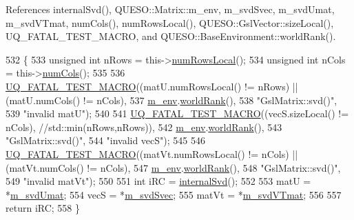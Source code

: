 References internal\-Svd(), Q\-U\-E\-S\-O\-::\-Matrix\-::m\-\_\-env, m\-\_\-svd\-Svec, m\-\_\-svd\-Umat, m\-\_\-svd\-V\-Tmat, num\-Cols(), num\-Rows\-Local(), Q\-U\-E\-S\-O\-::\-Gsl\-Vector\-::size\-Local(), U\-Q\-\_\-\-F\-A\-T\-A\-L\-\_\-\-T\-E\-S\-T\-\_\-\-M\-A\-C\-R\-O, and Q\-U\-E\-S\-O\-::\-Base\-Environment\-::world\-Rank().


\begin{DoxyCode}
532 \{
533   \textcolor{keywordtype}{unsigned} \textcolor{keywordtype}{int} nRows = this->\hyperlink{class_q_u_e_s_o_1_1_gsl_matrix_ab5ec937a9fd439eef1a87e12c0dbccb4}{numRowsLocal}();
534   \textcolor{keywordtype}{unsigned} \textcolor{keywordtype}{int} nCols = this->\hyperlink{class_q_u_e_s_o_1_1_gsl_matrix_ad5005f168fe030468e834776afb1859b}{numCols}();
535 
536   \hyperlink{_defines_8h_a56d63d18d0a6d45757de47fcc06f574d}{UQ\_FATAL\_TEST\_MACRO}((matU.numRowsLocal() != nRows) || (matU.numCols() != nCols),
537                       \hyperlink{class_q_u_e_s_o_1_1_matrix_a247fb0fc0b87fecdee054bb4660b68e8}{m\_env}.\hyperlink{class_q_u_e_s_o_1_1_base_environment_a78b57112bbd0e6dd0e8afec00b40ffa7}{worldRank}(),
538                       \textcolor{stringliteral}{"GslMatrix::svd()"},
539                       \textcolor{stringliteral}{"invalid matU"});
540 
541   \hyperlink{_defines_8h_a56d63d18d0a6d45757de47fcc06f574d}{UQ\_FATAL\_TEST\_MACRO}((vecS.sizeLocal() != nCols), \textcolor{comment}{//std::min(nRows,nRows)),}
542                       \hyperlink{class_q_u_e_s_o_1_1_matrix_a247fb0fc0b87fecdee054bb4660b68e8}{m\_env}.\hyperlink{class_q_u_e_s_o_1_1_base_environment_a78b57112bbd0e6dd0e8afec00b40ffa7}{worldRank}(),
543                       \textcolor{stringliteral}{"GslMatrix::svd()"},
544                       \textcolor{stringliteral}{"invalid vecS"});
545 
546   \hyperlink{_defines_8h_a56d63d18d0a6d45757de47fcc06f574d}{UQ\_FATAL\_TEST\_MACRO}((matVt.numRowsLocal() != nCols) || (matVt.numCols() != nCols),
547                       \hyperlink{class_q_u_e_s_o_1_1_matrix_a247fb0fc0b87fecdee054bb4660b68e8}{m\_env}.\hyperlink{class_q_u_e_s_o_1_1_base_environment_a78b57112bbd0e6dd0e8afec00b40ffa7}{worldRank}(),
548                       \textcolor{stringliteral}{"GslMatrix::svd()"},
549                       \textcolor{stringliteral}{"invalid matVt"});
550 
551   \textcolor{keywordtype}{int} iRC = \hyperlink{class_q_u_e_s_o_1_1_gsl_matrix_a971c0fcee50b741419f4f2322329647f}{internalSvd}();
552 
553   matU  = *\hyperlink{class_q_u_e_s_o_1_1_gsl_matrix_a764128029cce1c35d7371c6a7faf4161}{m\_svdUmat};
554   vecS  = *\hyperlink{class_q_u_e_s_o_1_1_gsl_matrix_a9c2d46159d01da442aba68fbeecb2dfc}{m\_svdSvec};
555   matVt = *\hyperlink{class_q_u_e_s_o_1_1_gsl_matrix_a5aca6b693035268ddcd679affc465d47}{m\_svdVTmat};
556 
557   \textcolor{keywordflow}{return} iRC;
558 \}
\end{DoxyCode}
